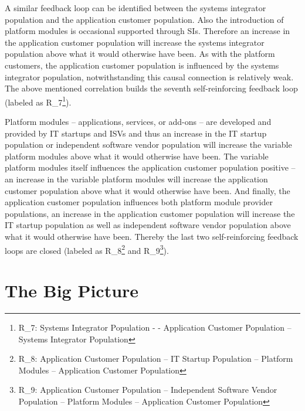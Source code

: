 A similar feedback loop can be identified between the systems integrator population and the application customer population. Also the introduction of platform modules is occasional supported through \acp{SI}. Therefore an increase in the application customer population will increase the systems integrator population above what it would otherwise have been. As with the platform customers, the application customer population is influenced by the systems integrator population, notwithstanding this causal connection is relatively weak. The above mentioned correlation builds the seventh self-reinforcing feedback loop (labeled as R\_7\footnote{R\_7: Systems Integrator Population - - Application Customer Population -- Systems Integrator Population}).

Platform modules -- applications, services, or add-ons -- are developed and provided by \ac{IT} startups and \acp{ISV} and thus an increase in the \ac{IT} startup population or independent software vendor population will increase the variable platform modules above what it would otherwise have been. The variable platform modules itself influences the application customer population positive -- an increase in the variable platform modules will increase the application customer population above what it would otherwise have been. And finally, the application customer population influences both platform module provider populations, an increase in the application customer population will increase the \ac{IT} startup population as well as independent software vendor population above what it would otherwise have been. Thereby the last two self-reinforcing feedback loops are closed (labeled as R\_8\footnote{R\_8: Application Customer Population -- \ac{IT} Startup Population -- Platform Modules -- Application Customer Population}  and R\_9\footnote{R\_9: Application Customer Population -- Independent Software Vendor Population -- Platform Modules -- Application Customer Population}).

\section{The Big Picture}\label{ch:cld:bp}

